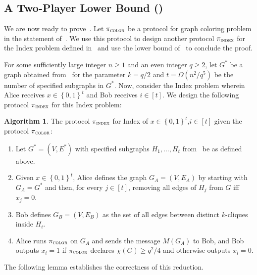 \documentclass[11pt]{article}
\theoremstyle{definition}
\newenvironment{ourbox}{\begin{mdframed}[hidealllines=false,innerleftmargin=10pt,backgroundcolor=white!10,innertopmargin=5pt,innerbottommargin=5pt,roundcorner=10pt]}{\end{mdframed}}
\newtheorem{mdalgorithm}{Algorithm}
\newenvironment{Algorithm}{\begin{ourbox}\begin{mdalgorithm}}{\end{mdalgorithm}\end{ourbox}}
\renewcommand{\geq}{\geqslant}
\newcommand{\set}[1]{\ensuremath{\left\{ #1 \right\}}}
\newcommand{\prot}{\ensuremath{\pi}}
\newcommand{\protindex}{\ensuremath{\prot_{\textnormal{\textsc{IND}}}}}
\begin{document}
\newcommand{\protcolor}{\pi_{\textsc{color}}}
\renewcommand{\protindex}{\pi_{\textsc{index}}}


\subsection{A Two-Player Lower Bound ()}\label{sec:two-player-reduction}

We are now ready to prove~. Let $\protcolor$ be a protocol for graph coloring problem in the statement of~. We use this protocol to design
another protocol $\protindex$ for the Index problem defined in~ and use the lower bound of~ to conclude the proof. 

For some sufficiently large integer $n \geq 1$ and an even integer $q \geq 2$, let $G^*$ be a graph obtained from~ for the parameter $k=q/2$ and $t=\Omega(n^2/q^5)$ be 
the number of specified subgraphs in $G^*$. Now, consider the Index problem wherein Alice receives $x \in \set{0,1}^t$ and Bob receives  $i \in [t]$. We design the following protocol $\protindex$ for this Index problem: 
\begin{Algorithm}\label{alg:protindex-adv}
	The protocol $\protindex$ for Index of $x \in \set{0,1}^t $,$ i \in [t]$ given the protocol $\protcolor$: 
	\begin{enumerate}
		\item Let $G^*=(V,E^*)$ with specified subgraphs $H_1,\ldots,H_t$ from~ be as defined above.
		\item Given $x \in \set{0,1}^{t}$, Alice defines the graph $G_A=(V,E_A)$ by starting with $G_A = G^*$ and then, for every $j \in [t]$, removing all edges of $H_j$ from $G$ iff $x_j= 0$.
		\item Bob defines $G_B = (V,E_B)$ as the set of all edges between distinct $k$-cliques inside $H_i$. 
		\item Alice runs $\protcolor$ on $G_A$ and sends the message $M(G_A)$ to Bob, and Bob outputs $x_i = 1$ if $\protcolor$ declares $\chi(G) \geq q^2/4$ and otherwise outputs $x_i = 0$. 
	\end{enumerate}
\end{Algorithm} 

The following lemma establishes the correctness of this reduction. 
\end{document}
